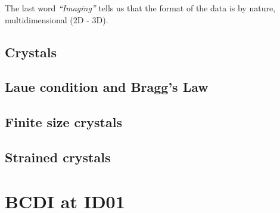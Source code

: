 The last word \textit{``Imaging''} tells us that the format of the data is by nature, multidimensional (2D - 3D). 

\subsection{Crystals}
\subsection{Laue condition and Bragg's Law} 
\subsection{Finite size crystals}
\subsection{Strained crystals}

\section{BCDI at ID01}\label{chp:phasing}
